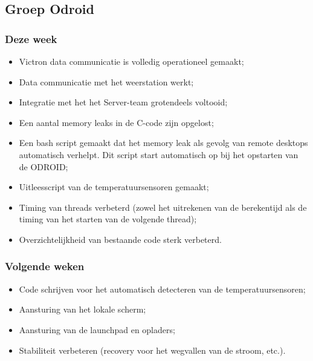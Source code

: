 \subsection*{Groep Odroid}
\subsubsection*{Deze week}
\begin{itemize}
\item Victron data communicatie is volledig operationeel gemaakt;
\item Data communicatie met het weerstation werkt;
\item Integratie met het het Server-team grotendeels voltooid;
\item Een aantal memory leaks in de C-code zijn opgelost;
\item Een bash script gemaakt dat het memory leak als gevolg van remote desktops automatisch verhelpt. Dit script start automatisch op bij het opstarten van de ODROID;
\item Uitleesscript van de temperatuursensoren gemaakt;
\item Timing van threads verbeterd (zowel het uitrekenen van de berekentijd als de timing van het starten van de volgende thread);
\item Overzichtelijkheid van bestaande code sterk verbeterd.
\end{itemize}

\subsubsection*{Volgende weken}
\begin{itemize}
\item Code schrijven voor het automatisch detecteren van de temperatuursensoren;
\item Aansturing van het lokale scherm;
\item Aansturing van de launchpad en opladers;
\item Stabiliteit verbeteren (recovery voor het wegvallen van de stroom, etc.).
\end{itemize}